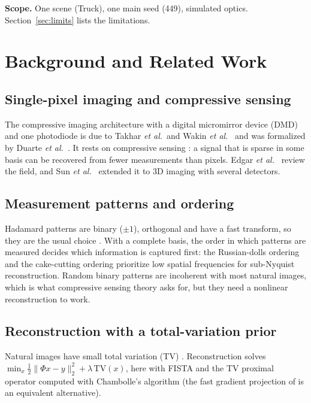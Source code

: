 \documentclass[conference]{IEEEtran}
\begin{document}
\textbf{Scope.} One scene (Truck), one main seed (449), simulated optics. Section~\ref{sec:limits} lists the limitations.

\section{Background and Related Work}
\subsection{Single-pixel imaging and compressive sensing}
The compressive imaging architecture with a digital micromirror device (DMD) and one photodiode is due to Takhar
\textit{et al.}\ and Wakin \textit{et al.}\ \cite{takhar2006,wakin2006} and was formalized by Duarte \textit{et al.}\
\cite{duarte2008}. It rests on compressive sensing \cite{donoho2006,candes2006}: a signal that is sparse in some basis can
be recovered from fewer measurements than pixels. Edgar \textit{et al.}\ \cite{edgar2019} review the field, and Sun
\textit{et al.}\ \cite{sun2013} extended it to 3D imaging with several detectors.

\subsection{Measurement patterns and ordering}
Hadamard patterns are binary ($\pm1$), orthogonal and have a fast transform, so they are the usual choice
\cite{zhang2017hadfourier}. With a complete basis, the order in which patterns are measured decides which information is
captured first: the Russian-dolls ordering \cite{sun2017russian} and the cake-cutting ordering \cite{yu2019cake}
prioritize low spatial frequencies for sub-Nyquist reconstruction. Random binary patterns are incoherent with most
natural images, which is what compressive sensing theory asks for, but they need a nonlinear reconstruction to work.

\subsection{Reconstruction with a total-variation prior}
Natural images have small total variation (TV) \cite{rudin1992}. Reconstruction solves
$\min_x \frac12\|\Phi x-y\|_2^2+\lambda\,\mathrm{TV}(x)$, here with FISTA \cite{beck2009fista} and the TV proximal operator
computed with Chambolle's algorithm \cite{chambolle2004} (the fast gradient projection of \cite{beck2009tv} is an
equivalent alternative).
\end{document}
